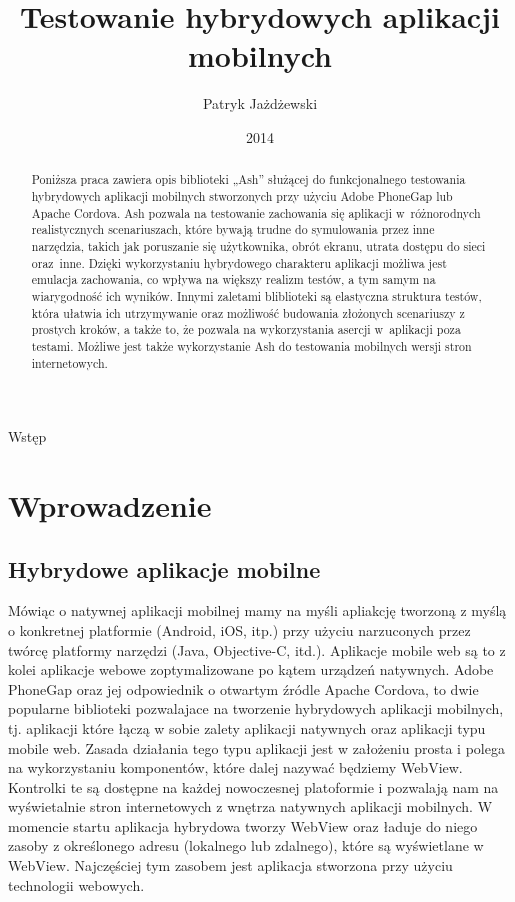 \documentclass[brudnopis]{xmgr}
\author   {Patryk Jażdżewski}
\title    {Testowanie hybrydowych aplikacji mobilnych}
\date     {2014}
\begin{document}
\begin{abstract}
  Poniższa praca zawiera opis biblioteki „Ash” służącej do funkcjonalnego testowania
hybrydowych aplikacji mobilnych stworzonych przy użyciu Adobe PhoneGap lub
Apache Cordova. Ash pozwala na testowanie zachowania się aplikacji w~różnorodnych
realistycznych scenariuszach, które bywają trudne do symulowania przez inne narzędzia, takich jak poruszanie się użytkownika,
obrót ekranu, utrata dostępu do sieci oraz~inne. Dzięki wykorzystaniu hybrydowego charakteru aplikacji
możliwa jest emulacja zachowania, co wpływa na większy realizm testów, a tym samym na wiarygodność ich wyników. Innymi
zaletami bliblioteki są elastyczna struktura testów, która ułatwia ich utrzymywanie oraz możliwość budowania złożonych scenariuszy z prostych kroków, a także
to, że pozwala na wykorzystania asercji w~aplikacji poza testami.
Możliwe jest także wykorzystanie Ash do testowania mobilnych wersji stron internetowych. 
\end{abstract}

\maketitle

\introduction

Wstęp

\chapter{Wprowadzenie}
\section{Hybrydowe aplikacje mobilne}
Mówiąc o natywnej aplikacji mobilnej mamy na myśli apliakcję tworzoną z myślą o konkretnej platformie (Android, iOS, itp.) przy użyciu narzuconych przez twórcę platformy narzędzi (Java, Objective-C, itd.). Aplikacje mobile web są to z kolei aplikacje webowe zoptymalizowane po kątem urządzeń natywnych.
Adobe PhoneGap oraz jej odpowiednik o otwartym źródle Apache Cordova, to
dwie popularne biblioteki pozwalajace na tworzenie hybrydowych aplikacji
mobilnych, tj. aplikacji które łączą w sobie zalety aplikacji natywnych oraz aplikacji
typu mobile web. Zasada działania tego typu aplikacji jest w założeniu prosta i
polega na wykorzystaniu komponentów, które dalej nazywać będziemy WebView.
Kontrolki te są dostępne na każdej nowoczesnej platoformie i pozwalają nam na
wyświetalnie stron internetowych z wnętrza natywnych aplikacji mobilnych. 
W momencie startu aplikacja hybrydowa tworzy WebView oraz ładuje do niego zasoby z określonego adresu (lokalnego lub zdalnego), które są wyświetlane w WebView. Najczęściej tym zasobem jest aplikacja stworzona przy użyciu technologii webowych.     
\end{document}
